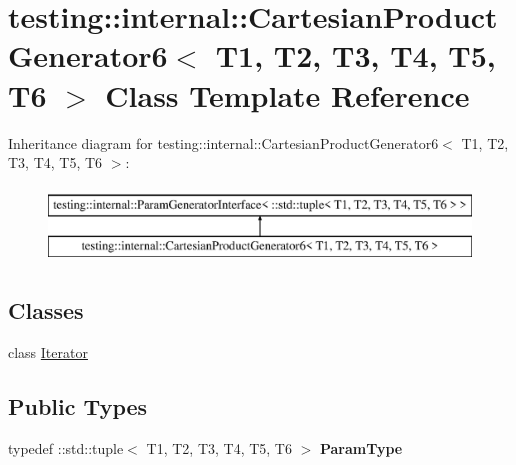 \hypertarget{classtesting_1_1internal_1_1_cartesian_product_generator6}{}\section{testing\+:\+:internal\+:\+:Cartesian\+Product\+Generator6$<$ T1, T2, T3, T4, T5, T6 $>$ Class Template Reference}
\label{classtesting_1_1internal_1_1_cartesian_product_generator6}
Inheritance diagram for testing\+:\+:internal\+:\+:Cartesian\+Product\+Generator6$<$ T1, T2, T3, T4, T5, T6 $>$\+:\begin{figure}[H]
\begin{center}
\leavevmode
\includegraphics[height=2.000000cm]{classtesting_1_1internal_1_1_cartesian_product_generator6}
\end{center}
\end{figure}
\subsection*{Classes}
\begin{DoxyCompactItemize}
\item 
class \mbox{\hyperlink{classtesting_1_1internal_1_1_cartesian_product_generator6_1_1_iterator}{Iterator}}
\end{DoxyCompactItemize}
\subsection*{Public Types}
\begin{DoxyCompactItemize}
\item 
\mbox{\label{classtesting_1_1internal_1_1_cartesian_product_generator6_aa9d67ce7d77623ebb27053bb2f704c62}} 
typedef \+::std\+::tuple$<$ T1, T2, T3, T4, T5, T6 $>$ {\bfseries Param\+Type}
\end{DoxyCompactItemize}
